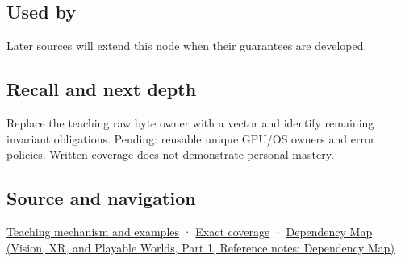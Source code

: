 \subsection{Used by}\label{appendix-7679107d057e-used-by}

\hypertarget{appendix-7679107d057e-used-by}{}

Later sources will extend this node when their guarantees are developed.

\subsection{Recall and next depth}\label{appendix-7679107d057e-recall-and-next-depth}

\hypertarget{appendix-7679107d057e-recall-and-next-depth}{}

Replace the teaching raw byte owner with a vector and identify remaining invariant obligations. Pending: reusable unique GPU/OS owners and error policies. Written coverage does not demonstrate personal mastery.

\subsection{Source and navigation}\label{appendix-7679107d057e-source-and-navigation}

\hypertarget{appendix-7679107d057e-source-and-navigation}{}

\hyperref[01-foundations-i-ch003-from-three-repairs-to-five-decisions-to-zero-boilerplate]{Teaching mechanism and examples} · \hyperref[appendix-fd090d982a15-m009---parts-127-147]{Exact coverage} · \href{../07-Vision-XR-and-Playable-Worlds-P01/main.pdf\#nameddest=appendix-4ad47bdd269a}{Dependency Map (Vision, XR, and Playable Worlds, Part 1, Reference notes: Dependency Map)}
